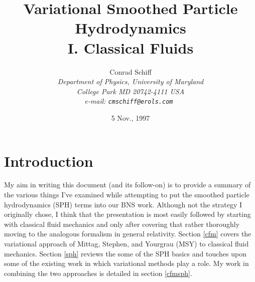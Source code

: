 


\title{Variational Smoothed Particle Hydrodynamics\\
	I. Classical Fluids}
%
\author{   \sc
            Conrad Schiff\\
           \em
            Department of Physics, University of Maryland%
           \\ \em
            College Park MD 20742-4111 USA\\
           \rm
         e-mail: \tt cmschiff@erols.com
        }
\date{5 Nov., 1997}
% 
\maketitle

\section{Introduction}

My aim in writing this document (and its follow-on) is to provide a summary of the various things I've examined while attempting to put the smoothed particle hydrodynamics (SPH) terms into our BNS work.  Although not the strategy I originally chose, I think that the presentation is most easily followed by starting with classical fluid mechanics and only after covering that rather thoroughly moving to the analogous formalism in general relativity.  Section \ref{cfm} covers the variational approach of Mittag, Stephen, and Yourgrau (MSY) to classical fluid mechanics.  Section \ref{sph} reviews the some of the SPH basics and touches upon some of the existing work in which variational methods play a role.  My work in combining the two approaches is detailed in section \ref{cfmsph}.

